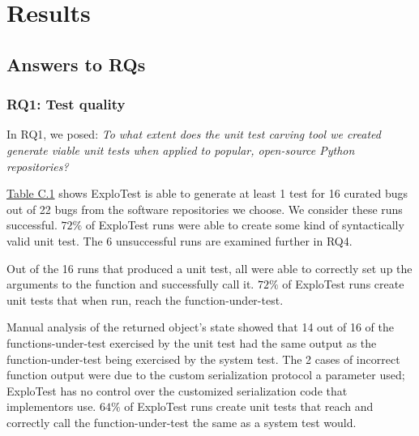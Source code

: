 \chapter{Results}



\section{Answers to RQs}

\subsection{RQ1: Test quality}

In RQ1, we posed: \textit{To what extent does the unit test carving tool we created generate viable
    unit tests when applied to popular,
    open-source Python repositories?}


\hyperref[sec:RQ1Results]{Table C.1} shows ExploTest is able to generate at least 1 test for 16 curated bugs out of 22 bugs
from the software repositories we choose. We consider these runs successful. $72\%$ of ExploTest runs were able to create
some kind of syntactically valid unit test. The 6 unsuccessful runs are examined further in RQ4.

Out of the 16 runs that produced a unit test, all were able to correctly set up the arguments to the function
and successfully call it.
$72\%$ of ExploTest runs create unit tests that when run, reach the function-under-test.

Manual analysis of the returned object's state showed that 14 out of 16 of the functions-under-test exercised by the unit test
had the same output as the function-under-test being exercised by the system test. The 2 cases of incorrect function output
were due to the custom serialization protocol a parameter used; ExploTest has no control over the customized serialization code
that implementors use.
$64\%$ of ExploTest runs create unit tests that reach and correctly call the function-under-test the same as a system test would.

